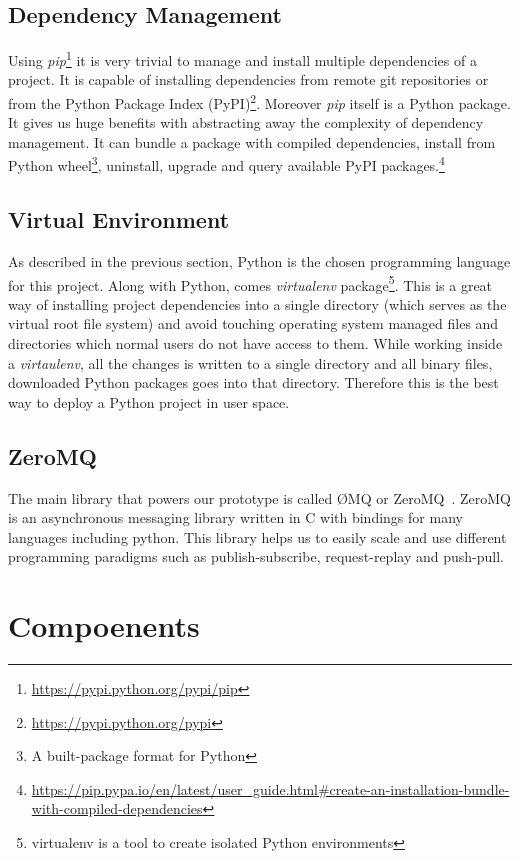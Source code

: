 \subsection{Dependency Management} Using \textit{pip}\footnote{\url{https://pypi.python.org/pypi/pip}}
it is very trivial to manage and install multiple
dependencies of a project. It is capable of installing dependencies from remote git repositories or from 
the Python Package Index (PyPI)\footnote{\url{https://pypi.python.org/pypi}}. Moreover \textit{pip} itself is
a Python package. It gives us huge benefits with abstracting away the complexity of dependency management. It can
bundle a package with compiled dependencies, install from Python wheel\footnote{A built-package format for Python}, uninstall,
upgrade and query available PyPI packages.\footnote{\url{https://pip.pypa.io/en/latest/user_guide.html\#create-an-installation-bundle-with-compiled-dependencies}}

\subsection{Virtual Environment}
As described in the previous section, Python is the chosen programming language for this project. Along with Python, 
comes \textit{virtualenv} package\footnote{virtualenv is a tool to create isolated Python environments}. This is a great way of installing
project dependencies into a single directory (which serves as the virtual root file system) and avoid touching operating system managed files and
directories which normal users do not have access to them. While working inside a \textit{virtaulenv}, all the changes is written to a single directory
and all binary files, downloaded Python packages goes into that directory. Therefore this is the best way to deploy a Python project in user space.

\subsection{ZeroMQ}
The main library that powers our prototype is called ØMQ or ZeroMQ~\cite{ZeroMQ}.
ZeroMQ is an asynchronous messaging library written in C with 
bindings for many languages including python. This library helps us to easily scale and use 
different programming paradigms such as publish-subscribe, request-replay and push-pull.

\section{Compoenents}
